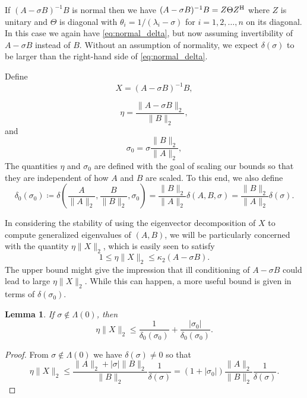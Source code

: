 \documentclass[12pt]{article}
\def\H{{\rm H}}
\newtheorem{lemma}{Lemma}
\begin{document}
If $(A-\sigma B)^{-1}B$ is normal then we have
$(A-\sigma B)^{-1}B = Z \Theta Z^\H$ where $Z$ is unitary and $\Theta$
is diagonal with $\theta_i = 1/(\lambda_i - \sigma)$ for
$i=1,2,\ldots, n$ on its diagonal.  In this case we again have
\eqref{eq:normal_delta}, but now assuming invertibility of
$A-\sigma B$ instead of $B$.  Without an assumption of normality, we
expect $\delta(\sigma)$ to be larger than the right-hand side of
\eqref{eq:normal_delta}.

Define
\begin{equation}
  \label{eq:Xdef}
  X = (A-\sigma B)^{-1} B,
\end{equation}

\begin{equation}
  \label{eq:eta_def}
  \eta = \frac{\|A-\sigma B\|_2}{\|B\|_2},
\end{equation}
and
\begin{equation}
  \label{eq:sigma0_def}
  \sigma_0 = \sigma \frac{\|B\|_2}{\|A\|_2},
\end{equation}
The quantities $\eta$ and $\sigma_0$ are defined with the goal of
scaling our bounds so that they are independent of how $A$ and $B$ are
scaled.  To this end, we also define
\begin{equation*}
  \delta_0(\sigma_0) \coloneqq \delta\left(\frac{A}{\|A\|_2}, \frac{B}{\|B\|_2}, \sigma_0 \right) =
  \frac{\|B\|_2}{\|A\|_2} \delta(A, B, \sigma)=\frac{\|B\|_2}{\|A\|_2} \delta(\sigma).
\end{equation*}

In considering the stability of using the eigenvector decomposition of $X$
to compute generalized eigenvalues of $(A,B)$, we will be particularly concerned with
the quantity $\eta \|X\|_2$, which is easily seen to satisfy
\begin{equation*}
  1 \leq \eta \|X\|_2 \leq \kappa_2(A-\sigma B).
\end{equation*}
The upper bound might give the impression that ill conditioning of
$A-\sigma B$ could lead to large $\eta \|X\|_2$.  While this can happen,
a more useful bound is given in terms of $\delta(\sigma_0)$.
\begin{lemma}
  \label{lm:eta_X_bound}
  If $\sigma \notin \Lambda(0)$, then
  \begin{equation*}
    \eta \|X\|_2 \leq \frac{1}{\delta_0(\sigma_0)} + \frac{|\sigma_0|}{\delta_0(\sigma_0)}.
  \end{equation*}
\end{lemma}
\begin{proof}
  From $\sigma \notin \Lambda(0)$ we have $\delta(\sigma)\neq 0$ so that
  \begin{equation*}
    \eta \|X\|_2
    \leq \frac{\|A\|_2 + |\sigma| \|B\|_2}{\|B\|_2} \frac{1}{\delta(\sigma)}
    = (1 + |\sigma_0|) \frac{\|A\|_2}{\|B\|_2} \frac{1}{\delta(\sigma)}.
  \end{equation*}
\end{proof}
\end{document}

